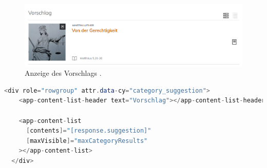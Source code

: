 \begin{figure}[h]
  \begin{centering}
    \includegraphics[width=\textwidth]{figures/development/suggestion.png}
    \caption{Anzeige des Vorschlags \cite{pfleiderer2022}.}
    \label{fig:suggestion}
  \end{centering}
\end{figure}


\begin{lstlisting}[language=Java, label={code:suggestionRow}, title={Code für Anzeige des Vorschlage \cite{frontend2022}}]
  <div role="rowgroup" attr.data-cy="category_suggestion">
    <app-content-list-header text="Vorschlag"></app-content-list-header>

    <app-content-list
      [contents]="[response.suggestion]"
      [maxVisible]="maxCategoryResults"
    ></app-content-list>
  </div>
\end{lstlisting}
